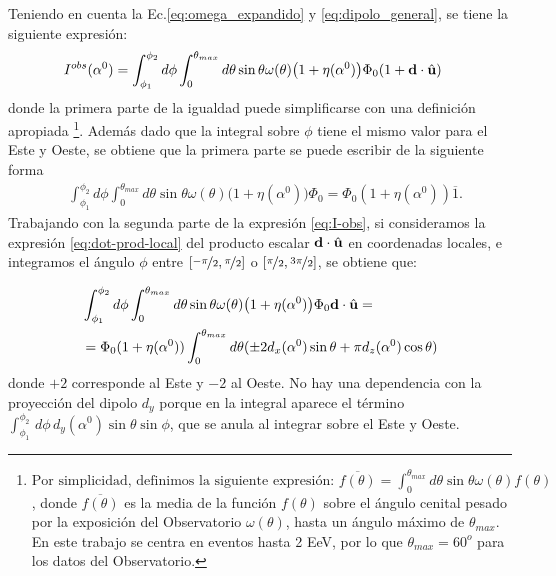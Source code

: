     Teniendo en cuenta la Ec.\ref{eq:omega_expandido} y \ref{eq:dipolo_general}, se tiene la siguiente expresión:
    \begin{align}
        I^{obs}(\alpha^0) &= \int_{\phi_1}^{\phi_2} d\phi \int_{0}^{\theta_{max}} d\theta  \sin\theta \omega(\theta)\big(1 + \eta(\alpha^0) \big) \Phi_0 ( 1 +  \textbf{d}\cdot\hat{\bf{u}}) \label{eq:I-obs}
    \end{align}
    donde la primera parte  de la igualdad  puede simplificarse con una definición apropiada  \footnote{ $
        \text{Por simplicidad, definimos la siguiente expresión: }
      \overline{f(\theta)} = \int_{0}^{\theta_{max}} d\theta \sin\theta \omega(\theta) f(\theta)
      \label{eq:media_angular}
  $
  \noindent, donde $\overline{f(\theta)}$ es la media de la función $f(\theta)$ sobre el ángulo cenital pesado por la exposición del Observatorio $\omega(\theta)$, hasta  un ángulo máximo de $\theta_{max}$. En este trabajo se centra en eventos hasta 2 EeV, por lo que $\theta_{max}=60^o$ para los datos del Observatorio.}. Además dado que la integral sobre $\phi$ tiene el mismo valor para el Este y Oeste, se  obtiene que la primera parte se puede escribir de la siguiente forma
    \begin{align*}
        &\int_{\phi_1}^{\phi_2} d\phi \int_{0}^{\theta_{max}} d\theta \sin\theta \omega(\theta)\big(1 + \eta(\alpha^0) \big) \Phi_0 
        = \Phi_0 (1+ \eta(\alpha^0)) \overline{1}. 
    \end{align*}
    Trabajando con la segunda parte de la expresión \ref{eq:I-obs}, si  consideramos la expresión \ref{eq:dot-prod-local} del producto escalar $\textbf{d}\cdot\hat{\bf{u}}$ en coordenadas locales, e integramos el ángulo  $\phi$ entre $[\nicefrac{-\pi}{2}, \nicefrac{\pi}{2}]$ o $[\nicefrac{\pi}{2}, \nicefrac{3\pi}{2}]$, se obtiene que:

    \begin{align}
        &\int_{\phi_1}^{\phi_2} d\phi \int_{0}^{\theta_{max}} d\theta \sin\theta \omega(\theta)\big(1 + \eta(\alpha^0) \big) \Phi_0 \textbf{d}\cdot\hat{\bf{u}}=\\
        &=\Phi_0 (1+ \eta(\alpha^0)) \int_{0}^{\theta_{max}}  d\theta (\pm 2d_x(\alpha^0)\sin\theta 
        + \pi d_z(\alpha^0)\cos\theta) \label{segundo_term}
    \end{align}
    \noindent donde $+2$ corresponde al Este y $-2$ al Oeste. No hay una dependencia con la proyección del dipolo $d_y$ porque en la integral aparece el término $\int_{\phi_1}^{\phi_2}\, d\phi\, d_y(\alpha^0) \sin\theta \sin\phi $, que se anula al integrar sobre el Este y Oeste.

